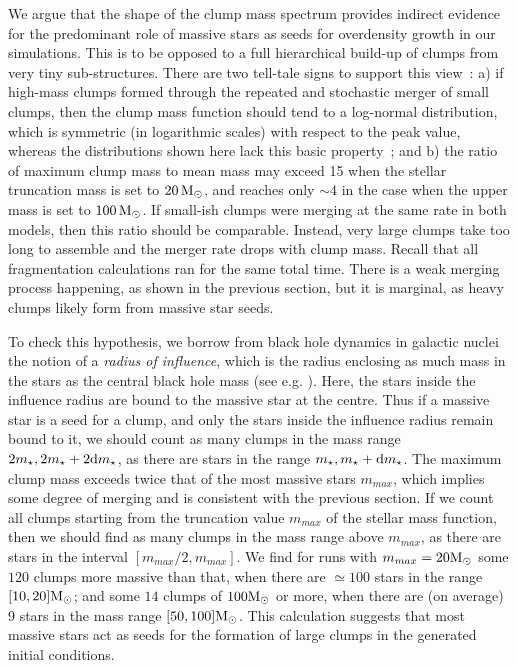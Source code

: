 We argue that the shape of the clump mass spectrum provides indirect evidence for the predominant role of massive stars as seeds for overdensity growth in our simulations. This is to be opposed to a full hierarchical build-up of clumps from very tiny sub-structures. There are two tell-tale signs to support this view~: a) if high-mass clumps formed through the repeated and stochastic merger of small clumps, then the clump mass function should tend to a log-normal distribution, which is  symmetric (in logarithmic scales) with respect to the peak value, whereas the distributions shown here lack this basic property~; and b) the ratio of maximum clump mass to mean mass may exceed 15 when the  stellar truncation mass is set to $20\, {\textrm{M}_\odot}$, and reaches only $\sim 4$ in the case when the upper mass is set to $100\, {\textrm{M}_\odot}$. If small-ish clumps were merging at the same rate in both models, then this ratio should be comparable. Instead, very large clumps take too long to assemble and the merger rate drops with clump mass. Recall that all fragmentation calculations ran for the same total time. There is a weak merging process happening, as shown in the previous section, but it is marginal, as heavy clumps likely form from massive star seeds.

To check this hypothesis, we borrow from black hole dynamics in galactic nuclei the notion of a {\it radius of influence}, which is the radius  enclosing as much mass in the stars as the central black hole mass (see e.g. \citealt{Merritt2013}).  Here, the stars inside the influence radius are bound to the massive star at the centre. Thus if a massive star is a seed for a clump, and only the stars inside the influence radius remain bound to it, we should count as many clumps in the mass range $2m_\star, 2 m_\star + 2{\rm d}m_\star$, as there are stars in the range $m_\star, m_\star + {\rm d}m_\star$.  The maximum clump mass exceeds twice that of the most massive stars $m_{max}$, which implies some degree of merging and is consistent with the previous section. If we count all clumps starting from the truncation value $m_{max}$ of the stellar mass function,  
then we should find as many clumps in the mass range above $m_{max}$, as there are stars in the interval $[m_{max}/2, m_{max}]$.  We find for runs with $m_{max} = 20 {\textrm{M}_\odot}$ some $120$ clumps more massive than that, when there are $\simeq 100$ stars in the range $[10, 20] {\textrm{M}_\odot}$; and some $14$ clumps of $100 {\textrm{M}_\odot}$ or more, when there are (on average) 9 stars in the mass range $[50, 100] {\textrm{M}_\odot}$. This calculation suggests that  most massive stars act as seeds for the formation of large clumps in the generated initial conditions.













